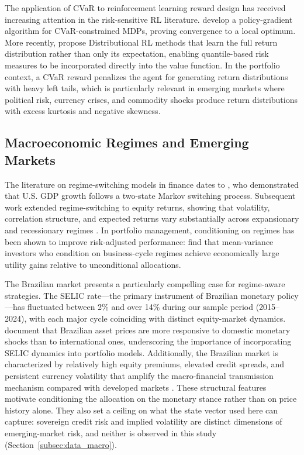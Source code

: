 The application of CVaR to reinforcement learning reward design has received
increasing attention in the risk-sensitive RL literature.
\citet{Tamar2015} develop a policy-gradient algorithm for CVaR-constrained MDPs,
proving convergence to a local optimum.
More recently, \citet{Dabney2018} propose Distributional RL methods that learn
the full return distribution rather than only its expectation, enabling
quantile-based risk measures to be incorporated directly into the value function.
In the portfolio context, a CVaR reward penalizes the agent for generating
return distributions with heavy left tails, which is particularly relevant in
emerging markets where political risk, currency crises, and commodity shocks
produce return distributions with excess kurtosis and negative skewness.

\subsection{Macroeconomic Regimes and Emerging Markets}
\label{subsec:lit_macro_regimes}

The literature on regime-switching models in finance dates to \citet{Hamilton1989},
who demonstrated that U.S. GDP growth follows a two-state Markov switching process.
Subsequent work extended regime-switching to equity returns, showing that volatility,
correlation structure, and expected returns vary substantially across expansionary and
recessionary regimes \citep{Ang2002}.
In portfolio management, conditioning on regimes has been shown to improve
risk-adjusted performance: \citet{Guidolin2007} find that mean-variance investors
who condition on business-cycle regimes achieve economically large utility gains
relative to unconditional allocations.

The Brazilian market presents a particularly compelling case for regime-aware
strategies.
The SELIC rate---the primary instrument of Brazilian monetary policy---has fluctuated
between 2\% and over 14\% during our sample period (2015--2024), with each major
cycle coinciding with distinct equity-market dynamics.
\citet{Sachsida2006} document that Brazilian asset prices are more responsive to
domestic monetary shocks than to international ones, underscoring the importance of
incorporating SELIC dynamics into portfolio models.
Additionally, the Brazilian market is characterized by relatively high equity
premiums, elevated credit spreads, and persistent currency volatility that amplify
the macro-financial transmission mechanism compared with developed markets
\citep{Bonomo2011}.
These structural features motivate conditioning the allocation on the monetary
stance rather than on price history alone.
They also set a ceiling on what the state vector used here can capture: sovereign
credit risk and implied volatility are distinct dimensions of emerging-market risk,
and neither is observed in this study (Section~\ref{subsec:data_macro}).
